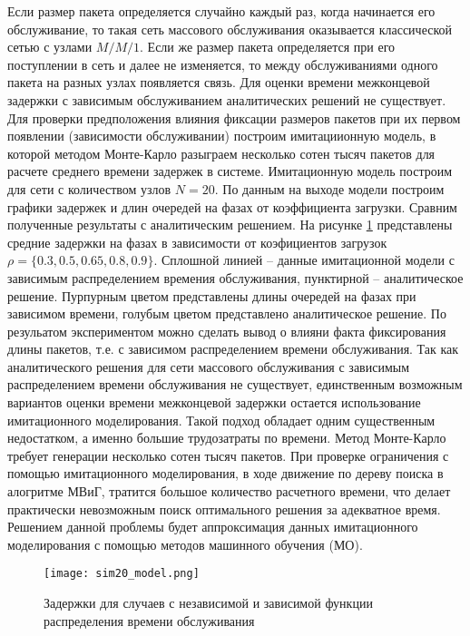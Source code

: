 Если размер пакета определяется случайно каждый раз, когда начинается его обслуживание, то такая сеть массового обслуживания оказывается классической сетью с узлами $M/M/1$. Если же размер пакета определяется при его поступлении в сеть и далее не изменяется, то между обслуживаниями одного пакета на разных узлах появляется связь. 
Для оценки времени межконцевой задержки с зависимым обслуживанием аналитических решений не существует. Для проверки предположения влияния фиксации размеров пакетов при их первом появлении (зависимости обслуживании) построим имитациионную модель, в которой методом Монте-Карло разыграем несколько сотен тысяч пакетов для расчете среднего времени задержек в системе. Имитационную модель построим для сети с количеством узлов $N=20$. По данным на выходе модели построим графики задержек и длин очередей на фазах от коэффициента загрузки. Сравним полученные результаты с аналитическим решением. На рисунке \cref{fig:sim20_model} представлены средние задержки на фазах в зависимости от коэфициентов загрузок $\rho = \{0.3, 0.5, 0.65, 0.8, 0.9\}$. Сплошной линией -- данные имитационной модели с зависимым распределением времения обслуживания, пунктирной -- аналитическое решение. Пурпурным цветом представлены длины очередей на фазах при зависимом времени, голубым цветом представлено аналитическое решение. По резульатом экспериментом можно сделать вывод о влияни факта фиксирования длины пакетов, т.е. с зависимом распределением времени обслуживания. Так как аналитического решения для сети массового обслуживания с зависимым распределением времени обслуживания не существует, единственным возможным вариантов оценки времени межконцевой задержки остается использование имитационного моделирования. Такой подход обладает одним существенным недостатком, а именно большие трудозатраты по времени. Метод Монте-Карло требует генерации несколько сотен тысяч пакетов. При проверке ограничения с помощью имитационного моделирования, в ходе движение по дереву поиска в алогритме МВиГ, тратится большое количество расчетного времени, что делает практически невозможным поиск оптимального решения за адекватное время. Решением данной проблемы будет аппроксимация данных имитационного моделирования с помощью методов машинного обучения (МО).

\begin{figure}[h!]
    \centering
     \texttt{[image: sim20\_model.png]}
  \caption{Задержки для случаев с независимой и зависимой функции распределения времени обслуживания}
  \label{fig:sim20_model}
\end{figure}

